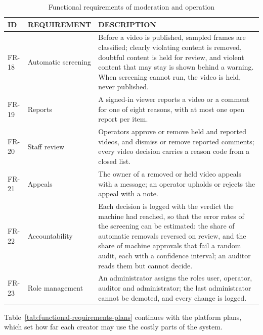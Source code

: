 \begin{table}[H]
\centering
\caption{Functional requirements of moderation and operation}
\label{tab:functional-requirements-moderation}
\small
\begin{tabularx}{\textwidth}{p{} p{} X}
\toprule
\textbf{ID} & \textbf{REQUIREMENT} & \textbf{DESCRIPTION} \\
\midrule
FR-18 & Automatic screening & Before a video is published, sampled frames are classified; clearly violating content is removed, doubtful content is held for review, and violent content that may stay is shown behind a warning. When screening cannot run, the video is held, never published. \\
FR-19 & Reports & A signed-in viewer reports a video or a comment for one of eight reasons, with at most one open report per item. \\
FR-20 & Staff review & Operators approve or remove held and reported videos, and dismiss or remove reported comments; every video decision carries a reason code from a closed list. \\
FR-21 & Appeals & The owner of a removed or held video appeals with a message; an operator upholds or rejects the appeal with a note. \\
FR-22 & Accountability & Each decision is logged with the verdict the machine had reached, so that the error rates of the screening can be estimated: the share of automatic removals reversed on review, and the share of machine approvals that fail a random audit, each with a confidence interval; an auditor reads them but cannot decide. \\
FR-23 & Role management & An administrator assigns the roles user, operator, auditor and administrator; the last administrator cannot be demoted, and every change is logged. \\
\bottomrule
\end{tabularx}
\end{table}

Table~\ref{tab:functional-requirements-plans} continues with the platform plans, which set how
far each creator may use the costly parts of the system.

